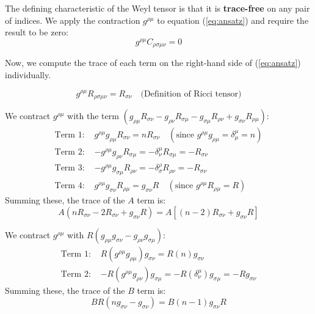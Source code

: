 \documentclass[11pt, a4paper]{report}
\begin{document}
The defining characteristic of the Weyl tensor is that it is \textbf{trace-free} on any pair of indices. We apply the contraction $g^{\rho\mu}$ to equation (\ref{eq:ansatz}) and require the result to be zero:
\begin{equation}
    g^{\rho\mu} C_{\rho\sigma\mu\nu} = 0
\end{equation}

Now, we compute the trace of each term on the right-hand side of (\ref{eq:ansatz}) individually.

\begin{equation}
    g^{\rho\mu} R_{\rho\sigma\mu\nu} = R_{\sigma\nu} \quad \text{(Definition of Ricci tensor)}
\end{equation}

We contract $g^{\rho\mu}$ with the term $(g_{\rho\mu} R_{\sigma\nu} - g_{\rho\nu} R_{\sigma\mu} - g_{\sigma\mu} R_{\rho\nu} + g_{\sigma\nu} R_{\rho\mu})$:
\begin{align*}
    \text{Term 1: } & g^{\rho\mu} g_{\rho\mu} R_{\sigma\nu} = n R_{\sigma\nu} \quad (\text{since } g^{\rho\mu}g_{\rho\mu} = \delta^\mu_\mu = n) \\
    \text{Term 2: } & - g^{\rho\mu} g_{\rho\nu} R_{\sigma\mu} = - \delta^\mu_\nu R_{\sigma\mu} = - R_{\sigma\nu} \\
    \text{Term 3: } & - g^{\rho\mu} g_{\sigma\mu} R_{\rho\nu} = - \delta^\rho_\sigma R_{\rho\nu} = - R_{\sigma\nu} \\
    \text{Term 4: } & g^{\rho\mu} g_{\sigma\nu} R_{\rho\mu} = g_{\sigma\nu} R \quad (\text{since } g^{\rho\mu}R_{\rho\mu} = R)
\end{align*}
Summing these, the trace of the $A$ term is:
\begin{equation}
    A ( n R_{\sigma\nu} - 2 R_{\sigma\nu} + g_{\sigma\nu} R ) = A [ (n-2) R_{\sigma\nu} + g_{\sigma\nu} R ]
\end{equation}

We contract $g^{\rho\mu}$ with $R (g_{\rho\mu} g_{\sigma\nu} - g_{\rho\nu} g_{\sigma\mu})$:
\begin{align*}
    \text{Term 1: } & R (g^{\rho\mu} g_{\rho\mu}) g_{\sigma\nu} = R (n) g_{\sigma\nu} \\
    \text{Term 2: } & - R (g^{\rho\mu} g_{\rho\nu}) g_{\sigma\mu} = - R (\delta^\mu_\nu) g_{\sigma\mu} = - R g_{\sigma\nu}
\end{align*}
Summing these, the trace of the $B$ term is:
\begin{equation}
    B R ( n g_{\sigma\nu} - g_{\sigma\nu} ) = B (n-1) g_{\sigma\nu} R
\end{equation}
\end{document}
